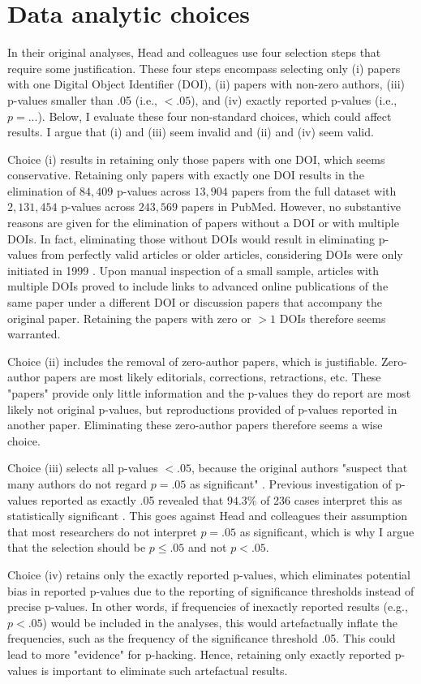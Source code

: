 \section*{Data analytic choices}
In their original analyses, Head and colleagues use four selection steps that require some justification. These four steps encompass selecting only (i) papers with one Digital Object Identifier (DOI), (ii) papers with non-zero authors, (iii) p-values smaller than .05 (i.e., $<.05$), and (iv) exactly reported p-values (i.e., $p=...$). Below, I evaluate these four non-standard choices, which could affect results. I argue that (i) and (iii) seem invalid and (ii) and (iv) seem valid.

Choice (i) results in retaining only those papers with one DOI, which seems conservative. Retaining only papers with exactly one DOI results in the elimination of $84,409$ p-values across $13,904$ papers from the full dataset with $2,131,454$ p-values across $243,569$ papers in PubMed. However, no substantive reasons are given for the elimination of papers without a DOI or with multiple DOIs. In fact, eliminating those without DOIs would result in eliminating p-values from perfectly valid articles or older articles, considering DOIs were only initiated in 1999 \cite{Crossre2009}. Upon manual inspection of a small sample, articles with multiple DOIs proved to include links to advanced online publications of the same paper under a different DOI or discussion papers that accompany the original paper. Retaining the papers with zero or $>1$ DOIs therefore seems warranted.

Choice (ii) includes the removal of zero-author papers, which is justifiable. Zero-author papers are most likely editorials, corrections, retractions, etc. These "papers" provide only little information and the p-values they do report are most likely not original p-values, but reproductions provided of p-values reported in another paper. Eliminating these zero-author papers therefore seems a wise choice.

Choice (iii) selects all p-values $<.05$, because the original authors "suspect that many authors do not regard $p=.05$ as significant" \cite{Head2015}. Previous investigation of p-values reported as exactly .05 revealed that $94.3\%$ of 236 cases interpret this as statistically significant \cite{Nuijten2015}. This goes against Head and colleagues their assumption that most researchers do not interpret $p=.05$ as significant, which is why I argue that the selection should be $p\leq.05$ and not $p<.05$.

Choice (iv) retains only the exactly reported p-values, which eliminates potential bias in reported p-values due to the reporting of significance thresholds instead of precise p-values. In other words, if frequencies of inexactly reported results (e.g., $p<.05$) would be included in the analyses, this would artefactually inflate the frequencies, such as the  frequency of the significance threshold .05. This could lead to more "evidence" for p-hacking. Hence, retaining only exactly reported p-values is important to eliminate such artefactual results.